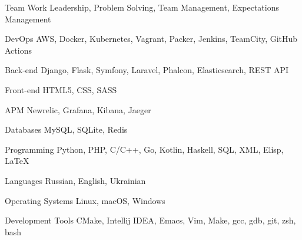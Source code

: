 
\begin{cvskills}

  \cvskill
    {Team Work}
    {Leadership, Problem Solving, Team Management, Expectations Management}

  \cvskill
    {DevOps}
    {AWS, Docker, Kubernetes, Vagrant, Packer, Jenkins, TeamCity, GitHub Actions}

  \cvskill
    {Back-end}
    {Django, Flask, Symfony, Laravel, Phalcon, Elasticsearch, REST API}

  \cvskill
    {Front-end}
    {HTML5, CSS, SASS}

  \cvskill
    {APM}
    {Newrelic, Grafana, Kibana, Jaeger}

  \cvskill
    {Databases}
    {MySQL, SQLite, Redis}

  \cvskill
    {Programming}
    {Python, PHP, C/C++, Go, Kotlin, Haskell, SQL, XML, Elisp, \LaTeX}

  \cvskill
    {Languages}
    {Russian, English, Ukrainian}

  \cvskill
    {Operating Systems}
    {Linux, macOS, Windows}

  \cvskill
    {Development Tools}
    {CMake, Intellij IDEA, Emacs, Vim, Make, gcc, gdb, git, zsh, bash}

\end{cvskills}
